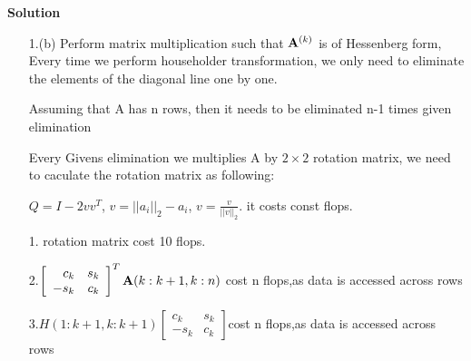 \documentclass[english,onecolumn]{IEEEtran}
\newcommand{\bA}{{\bf A}}
\begin{document}
\noindent
\textbf{Solution}
\begin{enumerate}
    \item[1.(b)] Perform matrix multiplication such that $\bA^{(k)}$ is of Hessenberg form, Every time we perform householder transformation, we only need to eliminate the elements of the diagonal line one by one.
    
    Assuming that A has n rows, then it needs to be eliminated n-1 times given elimination
    
    Every Givens elimination we multiplies A by $2 \times 2$ rotation matrix, we need to caculate the rotation matrix as following:
    
    
    $Q = I-2vv^T$, $v = ||a_i||_2-a_i$, $v = \frac{v}{||v||_2}.$  it costs const flops.
    
    1. rotation matrix cost 10 flops.
    
    2.$\left[\begin{array}{rr}
    	c_{k} & s_{k} \\
    	-s_{k} & c_{k}
    \end{array}\right]^T \bA(k: k+1, k: n)$ cost n flops,as data is accessed across rows

   3.$H(1: k+1, k: k+1)\left[\begin{array}{rr}
   	c_{k} & s_{k} \\
   	-s_{k} & c_{k}
   \end{array}\right]$cost n flops,as data is accessed across rows


\end{enumerate}
\end{document}
